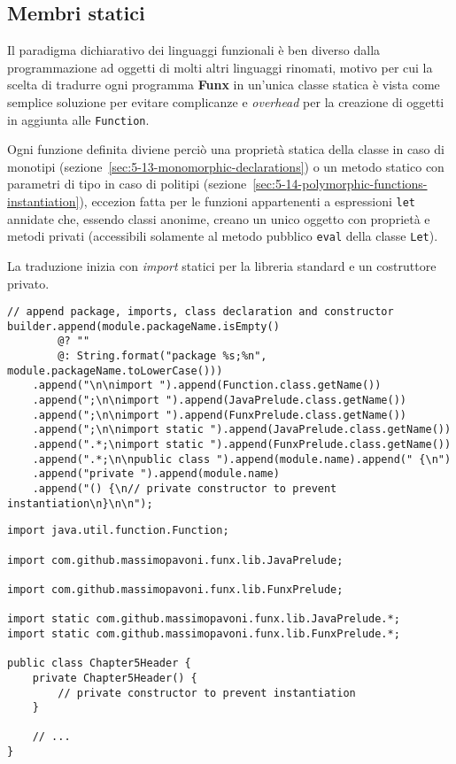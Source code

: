 \subsection{Membri statici}
\label{sec:5-11-static-members}

Il paradigma dichiarativo dei linguaggi funzionali è ben diverso dalla programmazione ad oggetti di molti altri linguaggi rinomati,
motivo per cui la scelta di tradurre ogni programma \textbf{Funx} in un'unica classe statica è vista come semplice soluzione
per evitare complicanze e \textit{overhead} per la creazione di oggetti in aggiunta alle \texttt{Function}.


Ogni funzione definita diviene perciò una proprietà statica della classe in caso di monotipi (sezione~\ref{sec:5-13-monomorphic-declarations})
o un metodo statico con parametri di tipo in caso di politipi (sezione~\ref{sec:5-14-polymorphic-functions-instantiation}),
eccezion fatta per le funzioni appartenenti a espressioni \texttt{let} annidate che, essendo classi anonime,
creano un unico oggetto con proprietà e metodi privati (accessibili solamente al metodo pubblico \texttt{eval} della classe \texttt{Let}).

\noindent La traduzione inizia con \textit{import} statici per la libreria standard e un costruttore privato.

\vspace{4mm}
\begin{lstlisting}[caption={Prime aggiunte alla stringa \texttt{Java}}, style=javaCode, label={lst:5-11-first-append-java}]
// append package, imports, class declaration and constructor
builder.append(module.packageName.isEmpty()
        @? ""
        @: String.format("package %s;%n", module.packageName.toLowerCase()))
    .append("\n\nimport ").append(Function.class.getName())
    .append(";\n\nimport ").append(JavaPrelude.class.getName())
    .append(";\n\nimport ").append(FunxPrelude.class.getName())
    .append(";\n\nimport static ").append(JavaPrelude.class.getName())
    .append(".*;\nimport static ").append(FunxPrelude.class.getName())
    .append(".*;\n\npublic class ").append(module.name).append(" {\n")
    .append("private ").append(module.name)
    .append("() {\n// private constructor to prevent instantiation\n}\n\n");
\end{lstlisting}
\vspace{4mm}
\begin{lstlisting}[caption={Corrispondente codice \texttt{Java} generato}, style=javaCode, label={lst:5-11-class-start-java}]
import java.util.function.Function;

import com.github.massimopavoni.funx.lib.JavaPrelude;

import com.github.massimopavoni.funx.lib.FunxPrelude;

import static com.github.massimopavoni.funx.lib.JavaPrelude.*;
import static com.github.massimopavoni.funx.lib.FunxPrelude.*;

public class Chapter5Header {
    private Chapter5Header() {
        // private constructor to prevent instantiation
    }

    // ...
}
\end{lstlisting}